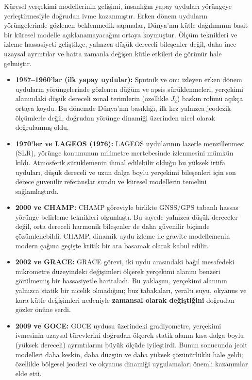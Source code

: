 Küresel yerçekimi modellerinin gelişimi, insanlığın yapay uyduları yörüngeye yerleştirmesiyle
doğrudan ivme kazanmıştır. Erken dönem uyduların yörüngelerinde gözlenen beklenmedik
sapmalar, Dünya’nın kütle dağılımının basit bir küresel modelle açıklanamayacağını ortaya koymuştur.
Ölçüm teknikleri ve izleme hassasiyeti geliştikçe, yalnızca düşük dereceli bileşenler değil,
daha ince uzaysal ayrıntılar ve hatta zamanla değişen kütle etkileri de görünür hale gelmiştir.

\begin{itemize}
\item \textbf{1957--1960’lar (ilk yapay uydular):}
Sputnik ve onu izleyen erken dönem uyduların yörüngelerinde gözlenen düğüm ve apsis sürüklenmeleri, yerçekimi alanındaki düşük dereceli zonal terimlerin (özellikle $J_2$) baskın rolünü açıkça ortaya koydu. Bu dönemde Dünya’nın basıklığı, ilk kez yalnızca jeodezik ölçümlerle değil, doğrudan yörünge dinamiği üzerinden nicel olarak doğrulanmış oldu.

\item \textbf{1970’ler ve LAGEOS (1976):}
LAGEOS uydularının lazerle menzillenmesi (SLR), yörünge konumunun milimetre mertebesinde izlenmesini mümkün kıldı. Atmosferik sürüklemenin ihmal edilebilir olduğu bu yüksek irtifa
uyduları, düşük dereceli ve uzun dalga boylu yerçekimi bileşenleri için son derece güvenilir referanslar sundu ve küresel modellerin temelini sağlamlaştırdı.

\item \textbf{2000 ve CHAMP:}
CHAMP göreviyle birlikte GNSS/GPS tabanlı hassas yörünge belirleme teknikleri olgunlaştı. Bu sayede yalnızca düşük dereceler değil, orta dereceli harmonik bileşenler de daha güvenilir biçimde çözümlenebildi. CHAMP, dinamik uydu izleme ile gravite modellemenin modern çağına geçişte kritik bir ara basamak olarak kabul edilir.

\item \textbf{2002 ve GRACE:}
GRACE görevi, iki uydu arasındaki bağıl mesafedeki mikrometre düzeyindeki değişimleri ölçerek yerçekimi alanını benzeri görülmemiş bir hassasiyetle haritaladı. Bu yaklaşım, yerçekimi alanının yalnızca statik bir nicelik olmadığını; buz tabakaları, yeraltı suyu, okyanus ve kara kütle değişimleri nedeniyle
\textbf{zamansal olarak değiştiğini} doğrudan gözler önüne serdi.

\item \textbf{2009 ve GOCE:}
GOCE uydusu üzerindeki gradiyometre, yerçekimi ivmesinin uzaysal türevlerini doğrudan ölçerek statik alanın kısa dalga boylu (yüksek dereceli) ayrıntılarını büyük ölçüde iyileştirdi.
Bunun sonucunda jeoit modelleri daha keskin, daha düzgün ve daha yüksek çözünürlüklü hale geldi; özellikle bölgesel jeodezi ve okyanus dinamiği uygulamaları önemli kazanımlar elde etti.


\end{itemize}
